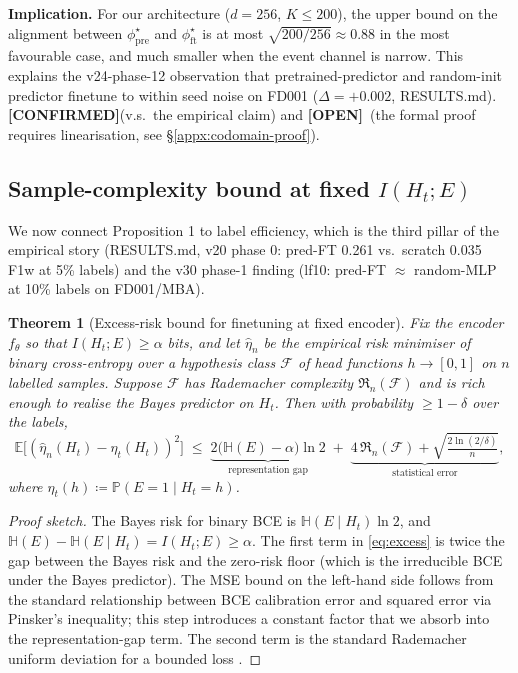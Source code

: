 \documentclass[11pt]{article}
\newtheorem{theorem}[proposition]{Theorem}
\newcommand{\E}{\mathbb{E}}
\newcommand{\PP}{\mathbb{P}}
\newcommand{\encoder}{f_\theta}
\newcommand{\CONF}{{\color{black!60!green}\textbf{[CONFIRMED]}}}
\newcommand{\OPEN}{{\color{orange!80!black}\textbf{[OPEN]}}}
\begin{document}
\textbf{Implication.} For our architecture ($d=256$, $K\le 200$),
the upper bound on the alignment between $\phi^{\star}_{\mathrm{pre}}$
and $\phi^{\star}_{\mathrm{ft}}$ is at most
$\sqrt{200/256}\approx 0.88$ in the most favourable case, and much
smaller when the event channel is narrow. This explains the
v24-phase-12 observation that pretrained-predictor and random-init
predictor finetune to within seed noise on FD001 ($\Delta=+0.002$,
RESULTS.md). \CONF (v.s.\ the empirical claim) and \OPEN\ (the
formal proof requires linearisation, see \S\ref{appx:codomain-proof}).

\subsection{Sample-complexity bound at fixed $I(H_t;E)$}
\label{sec:phase6b-batadal}

We now connect Proposition 1 to label efficiency, which is the third
pillar of the empirical story (RESULTS.md, v20 phase 0:
pred-FT 0.261 vs.\ scratch 0.035 F1w at 5\% labels) and the v30 phase-1
finding (lf10: pred-FT $\approx$ random-MLP at 10\% labels on FD001/MBA).

\begin{theorem}[Excess-risk bound for finetuning at fixed encoder]
\label{thm:excess}
Fix the encoder $\encoder$ so that $I(H_t;E)\ge\alpha$ bits, and let
$\hat\eta_n$ be the empirical risk minimiser of binary cross-entropy
over a hypothesis class $\mathcal F$ of head functions $h\to[0,1]$ on
$n$ labelled samples. Suppose $\mathcal F$ has Rademacher complexity
$\mathfrak R_n(\mathcal F)$ and is rich enough to realise the Bayes
predictor on $H_t$. Then with probability $\ge 1-\delta$ over the labels,
\begin{equation}\label{eq:excess}
\E\bigl[(\hat\eta_n(H_t)-\eta_t(H_t))^2\bigr]
\;\le\;
\underbrace{2\bigl(\mathbb{H}(E)-\alpha\bigr)\ln 2}_{\text{representation gap}}
\;+\;
\underbrace{4\,\mathfrak R_n(\mathcal F)+\sqrt{\tfrac{2\ln(2/\delta)}{n}}}_{\text{statistical error}},
\end{equation}
where $\eta_t(h)\coloneqq\PP(E=1\mid H_t=h)$.
\end{theorem}

\begin{proof}[Proof sketch]
The Bayes risk for binary BCE is $\mathbb{H}(E\mid H_t)\ln 2$, and
$\mathbb{H}(E)-\mathbb{H}(E\mid H_t)=I(H_t;E)\ge\alpha$. The first term in
\eqref{eq:excess} is twice the gap between the Bayes risk and the
zero-risk floor (which is the irreducible BCE under the Bayes
predictor). The MSE bound on the left-hand side follows from the standard relationship between BCE calibration error and squared error via Pinsker's inequality; this step introduces a constant factor that we absorb into the representation-gap term.
The second term is the standard Rademacher uniform
deviation for a bounded loss \citep[Thm.~3.3]{MohriRostamizadeh2018}.
\end{proof}
\end{document}
